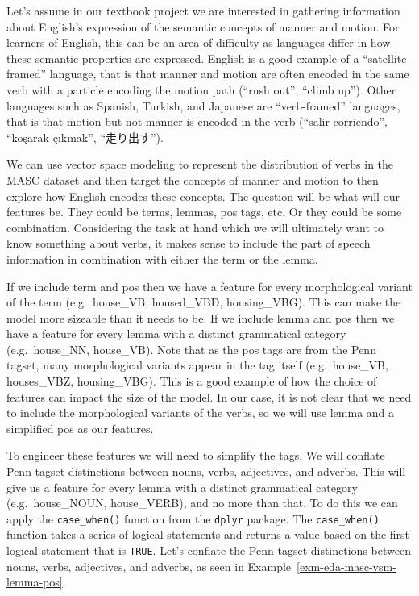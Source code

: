 \documentclass[
  letterpaper,
  DIV=11,
  numbers=noendperiod]{scrreport}
\theoremstyle{definition}
\theoremstyle{remark}
\begin{document}
Let's assume in our textbook project we are interested in gathering
information about English's expression of the semantic concepts of
manner and motion. For learners of English, this can be an area of
difficulty as languages differ in how these semantic properties are
expressed. English is a good example of a ``satellite-framed'' language,
that is that manner and motion are often encoded in the same verb with a
particle encoding the motion path (``rush out'', ``climb up''). Other
languages such as Spanish, Turkish, and Japanese are ``verb-framed''
languages, that is that motion but not manner is encoded in the verb
(``salir corriendo'', ``koşarak çıkmak'', ``走り出す'').

We can use vector space modeling to represent the distribution of verbs
in the MASC dataset and then target the concepts of manner and motion to
then explore how English encodes these concepts. The question will be
what will our features be. They could be terms, lemmas, pos tags, etc.
Or they could be some combination. Considering the task at hand which we
will ultimately want to know something about verbs, it makes sense to
include the part of speech information in combination with either the
term or the lemma.

If we include term and pos then we have a feature for every
morphological variant of the term (e.g.~house\_VB, housed\_VBD,
housing\_VBG). This can make the model more sizeable than it needs to
be. If we include lemma and pos then we have a feature for every lemma
with a distinct grammatical category (e.g.~house\_NN, house\_VB). Note
that as the pos tags are from the Penn tagset, many morphological
variants appear in the tag itself (e.g.~house\_VB, houses\_VBZ,
housing\_VBG). This is a good example of how the choice of features can
impact the size of the model. In our case, it is not clear that we need
to include the morphological variants of the verbs, so we will use lemma
and a simplified pos as our features.

To engineer these features we will need to simplify the tags. We will
conflate Penn tagset distinctions between nouns, verbs, adjectives, and
adverbs. This will give us a feature for every lemma with a distinct
grammatical category (e.g.~house\_NOUN, house\_VERB), and no more than
that. To do this we can apply the \texttt{case\_when()} function from
the \texttt{dplyr} package. The \texttt{case\_when()} function takes a
series of logical statements and returns a value based on the first
logical statement that is \texttt{TRUE}. Let's conflate the Penn tagset
distinctions between nouns, verbs, adjectives, and adverbs, as seen in
Example~\ref{exm-eda-masc-vsm-lemma-pos}.
\end{document}
